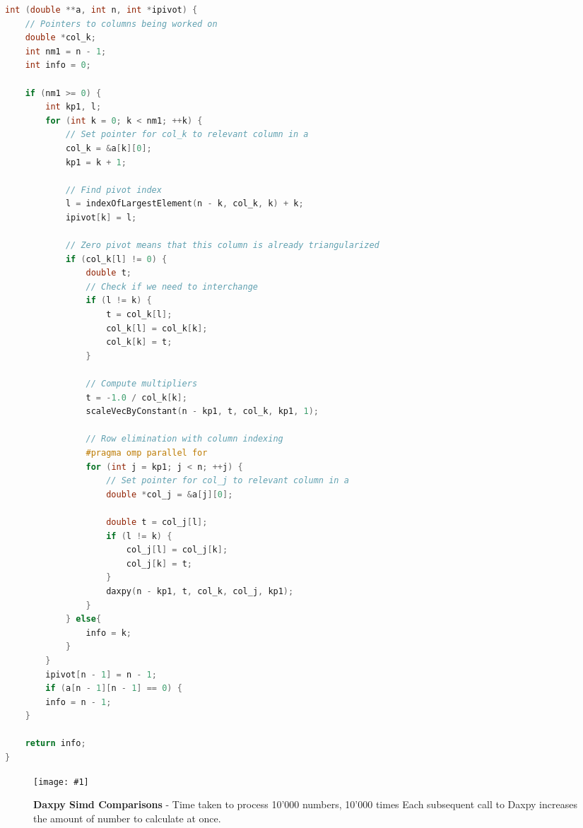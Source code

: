 \documentclass[conference]{acmsiggraph}
\newcommand{\figuremacroF}[4]{
	\begin{figure*}[t] %
		\centering
		\texttt{[image: \#1]}
		\caption[#2]{\textbf{#2} - #3}
		\label{fig:#1}
	\end{figure*}
}
\begin{document}
\begin{lstlisting}[language=C++,caption={Gaussian eliminate Code},label=gaussian_eliminateCode]
int (double **a, int n, int *ipivot) {
	// Pointers to columns being worked on
	double *col_k;
	int nm1 = n - 1;
	int info = 0;
	
	if (nm1 >= 0) {
		int kp1, l;
		for (int k = 0; k < nm1; ++k) {
			// Set pointer for col_k to relevant column in a
			col_k = &a[k][0];
			kp1 = k + 1;
			
			// Find pivot index
			l = indexOfLargestElement(n - k, col_k, k) + k;
			ipivot[k] = l;
			
			// Zero pivot means that this column is already triangularized
			if (col_k[l] != 0) {
				double t;
				// Check if we need to interchange
				if (l != k) {
					t = col_k[l];
					col_k[l] = col_k[k];
					col_k[k] = t;
				}
				
				// Compute multipliers
				t = -1.0 / col_k[k];
				scaleVecByConstant(n - kp1, t, col_k, kp1, 1);
				
				// Row elimination with column indexing
				#pragma omp parallel for
				for (int j = kp1; j < n; ++j) {
					// Set pointer for col_j to relevant column in a
					double *col_j = &a[j][0];
					
					double t = col_j[l];
					if (l != k) {
						col_j[l] = col_j[k];
						col_j[k] = t;
					}
					daxpy(n - kp1, t, col_k, col_j, kp1);
				}
			} else{
				info = k;
			}
		}
		ipivot[n - 1] = n - 1;
		if (a[n - 1][n - 1] == 0) {
		info = n - 1;
	}
	
	return info;
}
\end{lstlisting}

\figuremacroF
{SimdCompare}
{Daxpy Simd Comparisons}
{Time taken to process 10'000 numbers, 10'000 times Each subsequent call to Daxpy increases the amount of number to calculate at once.}
{0.83}
\end{document}
